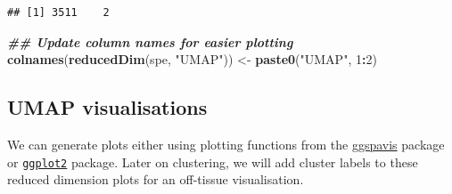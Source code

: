 \documentclass[
]{book}
\newenvironment{Shaded}{\begin{snugshade}}{\end{snugshade}}
\newcommand{\DecValTok}[1]{\textcolor[rgb]{0.00,0.00,0.81}{#1}}
\newcommand{\DocumentationTok}[1]{\textcolor[rgb]{0.56,0.35,0.01}{\textbf{\textit{#1}}}}
\newcommand{\FunctionTok}[1]{\textcolor[rgb]{0.13,0.29,0.53}{\textbf{#1}}}
\newcommand{\NormalTok}[1]{#1}
\newcommand{\OtherTok}[1]{\textcolor[rgb]{0.56,0.35,0.01}{#1}}
\newcommand{\SpecialCharTok}[1]{\textcolor[rgb]{0.81,0.36,0.00}{\textbf{#1}}}
\newcommand{\StringTok}[1]{\textcolor[rgb]{0.31,0.60,0.02}{#1}}
\begin{document}
\begin{verbatim}
## [1] 3511    2
\end{verbatim}

\begin{Shaded}
\begin{Highlighting}[]
\DocumentationTok{\#\# Update column names for easier plotting}
\FunctionTok{colnames}\NormalTok{(}\FunctionTok{reducedDim}\NormalTok{(spe, }\StringTok{"UMAP"}\NormalTok{)) }\OtherTok{\textless{}{-}} \FunctionTok{paste0}\NormalTok{(}\StringTok{"UMAP"}\NormalTok{, }\DecValTok{1}\SpecialCharTok{:}\DecValTok{2}\NormalTok{)}
\end{Highlighting}
\end{Shaded}

\hypertarget{umap-visualisations}{%
\subsection{UMAP visualisations}\label{umap-visualisations}}

We can generate plots either using plotting functions from the \href{https://bioconductor.org/packages/ggspavis}{ggspavis} package or \href{https://ggplot2.tidyverse.org/}{\texttt{ggplot2}} package. Later on clustering, we will add cluster labels to these reduced dimension plots for an off-tissue visualisation.
\end{document}
